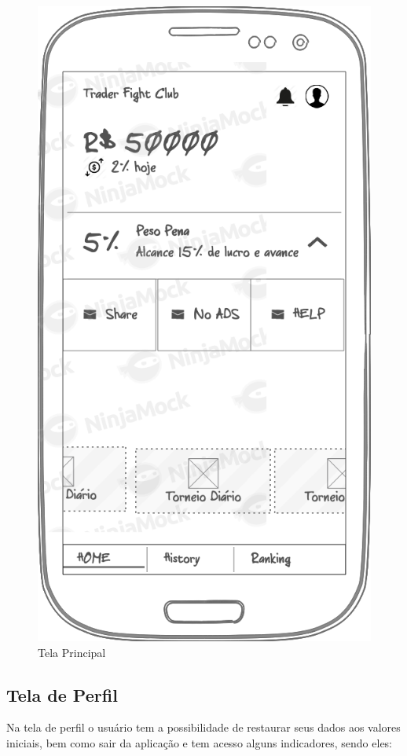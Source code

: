 \begin{figure}[H]
  \caption{\label{fig:mock_login}Tela Principal}
  \centering
  \includegraphics[scale=0.4]{imagens/mocks/main.png}
\end{figure}

\subsection{Tela de Perfil}
Na tela de perfil o usuário tem a possibilidade de restaurar seus dados aos valores iniciais, bem como sair da aplicação e tem acesso alguns indicadores, sendo eles:


